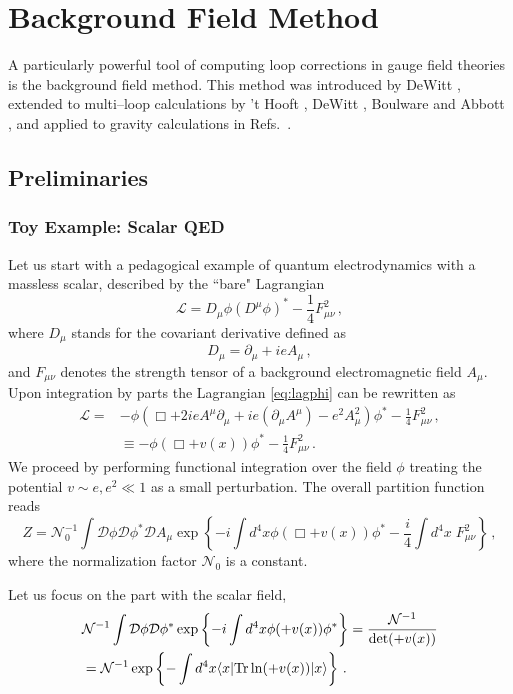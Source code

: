 \documentclass[11pt,a4paper]{article}
\newcommand{\be}{\begin{equation}}
\newcommand{\ee}{\end{equation}}
\newcommand\m{\mu}
\newcommand\D{\Delta}
\newcommand\n{\nu}
\def\d{\partial}
\renewcommand{\ln}{\mathop{\rm ln}\nolimits}
\renewcommand{\D}{\mathcal{D}}
\begin{document}
\section{Background Field Method}
\label{sec:back}

A particularly powerful tool of computing loop corrections in gauge field theories
is the background
field method.
This method was introduced by DeWitt \cite{DeWitt:1967ub}, extended to multi--loop calculations by 't Hooft \cite{'tHooft:1975vy}, DeWitt \cite{DeWitt:1980jv}, Boulware \cite{Boulware:1980av} and Abbott \cite{Abbott:1980hw}, and applied to gravity calculations in Refs.~\cite{'tHooft:1973us,'tHooft:1974bx}.

\subsection{Preliminaries}

\subsubsection{Toy Example: Scalar QED}

Let us start with a pedagogical example of quantum electrodynamics with
a massless scalar, described by the ``bare" Lagrangian
\be
\label{eq:lagphi}
\mathcal{L}=D_\m \phi (D^\m \phi)^*-\frac{1}{4}F_{\mu \n}^2\,,
\ee
where $D_\mu$ stands for the covariant derivative defined as
\be
D_\mu=\d_\m+ieA_\m \,,
\ee
and $F_{\mu \nu}$ denotes the strength tensor of a background electromagnetic
field $A_{\mu}$.
Upon integration by parts the Lagrangian \eqref{eq:lagphi} can be rewritten as
\be
\begin{split}
 \mathcal{L}=&-\phi (\Box +2ie A^\m \d_\m+ie(\d_\m A^\m)-e^2A_\m^2) \phi^*-\frac{1}{4}F_{\mu \n}^2\,,\\
 &\equiv -\phi (\Box +v(x)) \phi^*-\frac{1}{4}F_{\mu \n}^2\,.
 \end{split}
\ee
We proceed by performing functional integration over the field $\phi$
treating the potential $v \sim e,e^2\ll 1$ as a small perturbation.
The overall partition function reads
\be
Z= \mathcal{N}_0^{-1}\int \D\phi\D\phi^* \D A_\mu \exp\left\{-i\int d^4x \phi (\Box +v(x)) \phi^* -\frac{i}{4}
\int d^4x \;F_{\mu \nu}^2
\right\}\,,
\ee
where the normalization factor $\mathcal{N}_0$ is a constant.

Let us focus on the part with the scalar field,
\be
\label{eq:pathint}
\begin{split}
&\mathcal{N}^{-1}\int \D \phi \D \phi^* \exp\left\{-i\int d^4x \phi (\Box +v(x)) \phi^* \right\}=\frac{\mathcal{N}^{-1}}{\text{det}(\Box +v(x))}\\
&=
\mathcal{N}^{-1}\exp\left\{-\int d^4x \langle x| \text{Tr}\ln(\Box +v(x)) |x\rangle \right\}\,.
\end{split}
\ee
\end{document}
